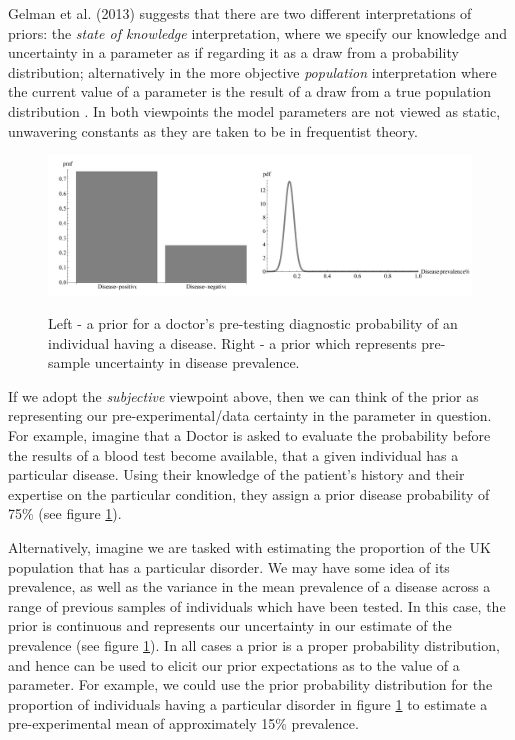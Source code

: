 \documentclass[11pt,fullpage]{book}
\begin{document}
Gelman et al. (2013) suggests that there are two different interpretations of priors: the \textit{state of knowledge} interpretation, where we specify our knowledge and uncertainty in a parameter as if regarding it as a draw from a probability distribution; alternatively in the more objective \textit{population} interpretation where the current value of a parameter is the result of a draw from a true population distribution \cite{gelman2013bayesian}. In both viewpoints the model parameters are not viewed as static, unwavering constants as they are taken to be in frequentist theory.

\begin{figure}
\centering
\scalebox{0.3} 
{\includegraphics{Prior_introduction.pdf}}
\caption{Left - a prior for a doctor's pre-testing diagnostic probability of an individual having a disease. Right - a prior which represents pre-sample uncertainty in disease prevalence.}\label{fig:Prior_introduction}
\end{figure}

If we adopt the \textit{subjective} viewpoint above, then we can think of the prior as representing our pre-experimental/data certainty in the parameter in question. For example, imagine that a Doctor is asked to evaluate the probability before the results of a blood test become available, that a given individual has a particular disease. Using their knowledge of the patient's history and their expertise on the particular condition, they assign a prior disease probability of 75\% (see figure \ref{fig:Prior_introduction}). 

Alternatively, imagine we are tasked with estimating the proportion of the UK population that has a particular disorder. We may have some idea of its prevalence, as well as the variance in the mean prevalence of a disease across a range of previous samples of individuals which have been tested. In this case, the prior is continuous and represents our uncertainty in our estimate of the prevalence (see figure \ref{fig:Prior_introduction}). In all cases a prior is a proper probability distribution, and hence can be used to elicit our prior expectations as to the value of a parameter. For example, we could use the prior probability distribution for the proportion of individuals having a particular disorder in figure \ref{fig:Prior_introduction} to estimate a pre-experimental mean of approximately 15\% prevalence.
\end{document}

